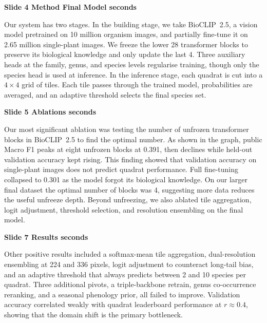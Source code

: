 \documentclass[11pt]{article}
\begin{document}
\noindent\textbf{Slide 4 \quad Method Final Model  seconds}

Our system has two stages. In the building stage, we take BioCLIP~2.5, a
vision model pretrained on 10 million organism images, and partially fine-tune
it on 2.65 million single-plant images. We freeze the lower 28 transformer
blocks to preserve its biological knowledge and only update the last 4. Three
auxiliary heads at the family, genus, and species levels regularise training,
though only the species head is used at inference. In the inference stage,
each quadrat is cut into a $4{\times}4$ grid of tiles. Each tile passes
through the trained model, probabilities are averaged, and an adaptive
threshold selects the final species set.

\vspace{6pt}

\noindent\textbf{Slide 5 \quad Ablations  seconds}

Our most significant ablation was testing the number of unfrozen transformer
blocks in BioCLIP~2.5 to find the optimal number. As shown in the graph,
public Macro F1 peaks at eight unfrozen blocks at 0.391, then declines while
held-out validation accuracy kept rising. This finding showed that validation
accuracy on single-plant images does not predict quadrat performance. Full
fine-tuning collapsed to 0.301 as the model forgot its biological knowledge.
On our larger final dataset the optimal number of blocks was 4, suggesting
more data reduces the useful unfreeze depth. Beyond unfreezing, we also
ablated tile aggregation, logit adjustment, threshold selection, and resolution
ensembling on the final model.

\vspace{6pt}

\noindent\textbf{Slide 7 \quad Results  seconds}

Other positive results included a softmax-mean tile aggregation, dual-resolution
ensembling at 224 and 336 pixels, logit adjustment to counteract long-tail
bias, and an adaptive threshold that always predicts between 2 and 10 species
per quadrat. Three additional pivots, a triple-backbone retrain, genus
co-occurrence reranking, and a seasonal phenology prior, all failed to
improve. Validation accuracy correlated weakly with quadrat leaderboard
performance at $r{\approx}0.4$, showing that the domain shift is the primary
bottleneck.

\vspace{6pt}
\end{document}
